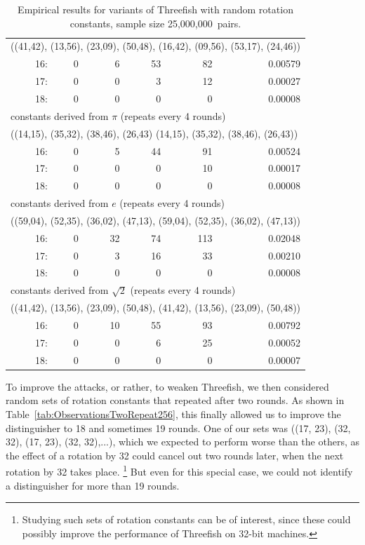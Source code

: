 \documentclass[11pt,twoside]{article}
\begin{document}
\begin{table}[htbp]
\begin{tabular}{|r|rrrr|r|}
\multicolumn{6}{|l|}{((41,42), (13,56), (23,09), (50,48),
                      (16,42), (09,56), (53,17), (24,46))} \\
 16: &  0 &  6 &  53 &  82 & 0.00579  \\
 17: &  0 &  0 &  3 &  12 & 0.00027  \\
 18: &  0 &  0 &  0 &  0 & 0.00008  \\ \hline\hline
\multicolumn{6}{|l|}{constants derived from $\pi$ (repeats every 4 rounds)} \\ 
\multicolumn{6}{|l|}{((14,15), (35,32), (38,46), (26,43)
                      (14,15), (35,32), (38,46), (26,43))} \\
 16: &  0 &  5 &  44 &  91 & 0.00524  \\
 17: &  0 &  0 &  0 &  10 & 0.00017  \\
 18: &  0 &  0 &  0 &  0 & 0.00008  \\ \hline\hline
\multicolumn{6}{|l|}{constants derived from $e$ (repeats every 4 rounds)} \\ 
\multicolumn{6}{|l|}{((59,04), (52,35), (36,02), (47,13),
                      (59,04), (52,35), (36,02), (47,13))} \\
 16: &  0 &  32 &  74 &  113 & 0.02048  \\
 17: &  0 &  3 &  16 &  33 & 0.00210  \\
 18: &  0 &  0 &  0 &  0 & 0.00008  \\ \hline\hline
\multicolumn{6}{|l|}{constants derived from $\sqrt{2}$ (repeats every 4 rounds)} \\ 
\multicolumn{6}{|l|}{((41,42), (13,56), (23,09), (50,48),
                      (41,42), (13,56), (23,09), (50,48))} \\
 16: &  0 &  10 &  55 &  93 & 0.00792  \\
 17: &  0 &  0 &  6 &  25 & 0.00052  \\
 18: &  0 &  0 &  0 &  0 & 0.00007  \\ \hline\hline
\end{tabular}
  \caption{Empirical results for variants of Threefish with random rotation constants,
           sample size 25,000,000~pairs.}
  \label{tab:ObservationsRandom256}
\end{table}

To improve the attacks, or rather, to weaken Threefish, we then considered random sets of rotation constants that repeated after two rounds. As shown in Table~\ref{tab:ObservationsTwoRepeat256}, this finally allowed us to improve the distinguisher to 18 and sometimes 19 rounds. One of our sets was ((17, 23), (32, 32), (17, 23), (32, 32),...), which we expected to perform worse than the others, as the effect of a rotation by 32 could cancel out two rounds later, when the next rotation by 32 takes place.%
\footnote{Studying such sets of rotation constants can be of interest, since these could possibly improve the performance of Threefish on 32-bit machines.} 
But even for this special case, we could not identify a distinguisher for more than 19 rounds. 
\end{document}
